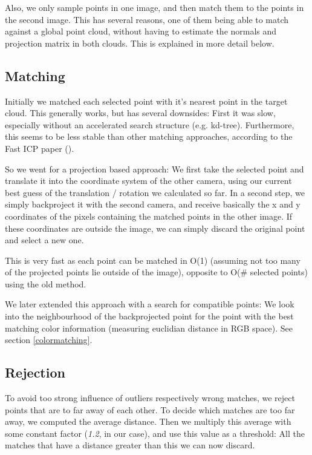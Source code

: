 \documentclass[10pt,twocolumn,letterpaper]{article}
\begin{document}
Also, we only sample points in one image, and then match them to the points in the second image. This has several reasons, one of them
being able to match against a global point cloud, without having to estimate the normals and projection matrix in both clouds.
This is explained in more detail below.

\subsection{Matching}
\label{backprojection}

Initially we matched each selected point with it's nearest point in the target cloud. 
This generally works, but has several downsides: First it was slow, especially without an accelerated search structure (e.g. kd-tree). 
Furthermore, this seems to be less stable than other matching approaches, according to the Fast ICP paper (\cite{fasticp}).

So we went for a projection based approach: We first take the selected point and translate it into the coordinate system of the other camera,
using our current best guess of the translation / rotation we calculated so far. In a second step, we simply backproject it with the second camera,
and receive basically the x and y coordinates of the pixels containing the matched points in the other image. If these coordinates are outside the image,
we can simply discard the original point and select a new one.

This is very fast as each point can be matched in O(1) (assuming not too many of the projected points lie outside of the image), opposite to
O(\# selected points) using the old method.

We later extended this approach with a search for compatible points: We look into the neighbourhood of the backprojected point
for the point with the best matching color information (measuring euclidian distance in RGB space). See section \ref{colormatching}.

\subsection{Rejection}
To avoid too strong influence of outliers respectively wrong matches, we reject points that are to far away of each other. 
To decide which matches are too far away, we computed the average distance. Then we multiply this average with some constant
factor (\textit{1.2}, in our case), and use this value as a threshold: All the matches that have a distance greater than this
we can now discard.
\end{document}

